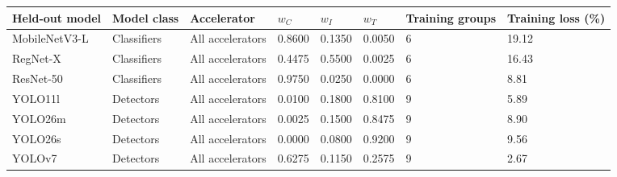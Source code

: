 \begin{tabular}{@{}llllllll@{}}
\toprule
Held-out model & Model class & Accelerator & $w_C$ & $w_I$ & $w_T$ & Training groups & Training loss (\%) \\
\midrule
MobileNetV3-L & Classifiers & All accelerators & 0.8600 & 0.1350 & 0.0050 & 6 & 19.12 \\
RegNet-X & Classifiers & All accelerators & 0.4475 & 0.5500 & 0.0025 & 6 & 16.43 \\
ResNet-50 & Classifiers & All accelerators & 0.9750 & 0.0250 & 0.0000 & 6 & 8.81 \\
YOLO11l & Detectors & All accelerators & 0.0100 & 0.1800 & 0.8100 & 9 & 5.89 \\
YOLO26m & Detectors & All accelerators & 0.0025 & 0.1500 & 0.8475 & 9 & 8.90 \\
YOLO26s & Detectors & All accelerators & 0.0000 & 0.0800 & 0.9200 & 9 & 9.56 \\
YOLOv7 & Detectors & All accelerators & 0.6275 & 0.1150 & 0.2575 & 9 & 2.67 \\
\bottomrule
\end{tabular}
